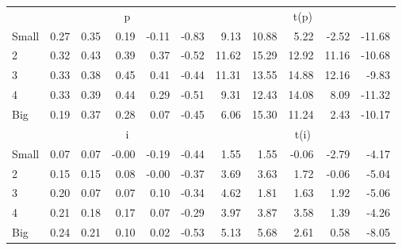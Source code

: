 \begin{table}[!ht]
\begin{tabular}{lrrrrrrrrrr}
      & \multicolumn{5}{c}{p} & \multicolumn{5}{c}{t(p)}
    
    \\
      \cmidrule(r){2-6} \cmidrule(r){7-11}

    Small   & 0.27  & 0.35  & 0.19  & -0.11  & -0.83  & 9.13  & 10.88  & 5.22  & -2.52  & -11.68  \\
         2  & 0.32  & 0.43  & 0.39  & 0.37  & -0.52  & 11.62  & 15.29  & 12.92  & 11.16  & -10.68  \\
         3  & 0.33  & 0.38  & 0.45  & 0.41  & -0.44  & 11.31  & 13.55  & 14.88  & 12.16  & -9.83  \\
         4  & 0.33  & 0.39  & 0.44  & 0.29  & -0.51  & 9.31  & 12.43  & 14.08  & 8.09  & -11.32  \\
    Big     & 0.19  & 0.37  & 0.28  & 0.07  & -0.45  & 6.06  & 15.30  & 11.24  & 2.43  & -10.17  \\

  
    
      & \multicolumn{5}{c}{i} & \multicolumn{5}{c}{t(i)}
    
    \\
      \cmidrule(r){2-6} \cmidrule(r){7-11}

    Small   & 0.07  & 0.07  & -0.00  & -0.19  & -0.44  & 1.55  & 1.55  & -0.06  & -2.79  & -4.17  \\
         2  & 0.15  & 0.15  & 0.08  & -0.00  & -0.37  & 3.69  & 3.63  & 1.72  & -0.06  & -5.04  \\
         3  & 0.20  & 0.07  & 0.07  & 0.10  & -0.34  & 4.62  & 1.81  & 1.63  & 1.92  & -5.06  \\
         4  & 0.21  & 0.18  & 0.17  & 0.07  & -0.29  & 3.97  & 3.87  & 3.58  & 1.39  & -4.26  \\
    Big     & 0.24  & 0.21  & 0.10  & 0.02  & -0.53  & 5.13  & 5.68  & 2.61  & 0.58  & -8.05  \\

  

  \bottomrule
\end{tabular}
\label{tbl:25_Size_Var_F15}
\end{table}